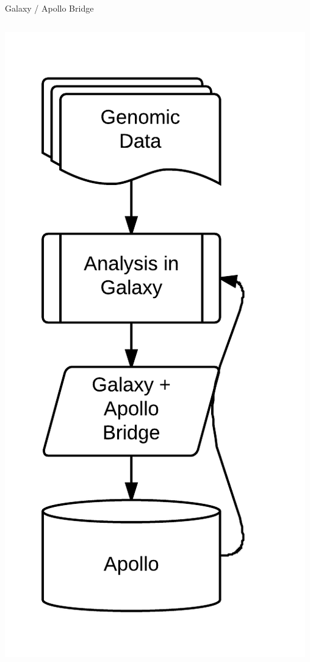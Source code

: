 \documentclass[12pt]{phage3slides} %
\begin{document}
\begin{frame}{Galaxy / Apollo Bridge}
\begin{columns}
\begin{column}{0.38\textwidth}
            \includegraphics[height=\textheight]{img/wf.png}
        \end{column}
    \end{columns}
\end{frame}
\end{document}
